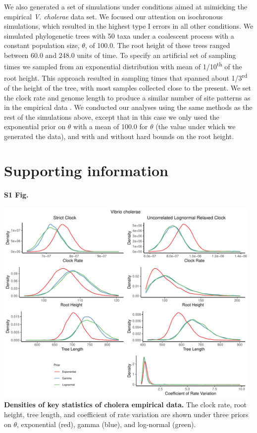 \documentclass[10pt,letterpaper]{article}
\begin{document}
{We also generated a set of simulations under conditions aimed at mimicking the empirical \textit{V. cholerae} data set. We focused our attention on isochronous simulations, which resulted in the highest type I errors in all other conditions. We simulated phylogenetic trees with 50 taxa under a coalescent process with a constant population size, $\theta$, of 100.0. The root height of these trees ranged between 60.0 and 248.0 units of time. To specify an artificial set of sampling times we sampled from an exponential distribution with mean of 1/10\textsuperscript{th} of the root height. This approach resulted in sampling times that spanned about 1/3\textsuperscript{rd} of the height of the tree, with most samples collected close to the present. We set the clock rate and genome length to produce a similar number of site patterns as in the empirical data \cite{devault2014second}. We conducted our analyses using the same methods as the rest of the simulations above, except that in this case we only used the exponential prior on $\theta$ with a mean of 100.0 for $\theta$ (the value under which we generated the data), and with and without hard bounds on the root height.}

\section*{Supporting information}

\paragraph*{S1 Fig.}
\label{S1_Fig}
	\begin{center}
		\includegraphics[width=13cm]{sandbox_figures/cholera_density_plot.pdf}\newline
		\textbf{Densities of key statistics of cholera empirical data.} The clock rate, root height, tree length, and coefficient of rate variation are shown under three priors on $\theta$, exponential (red), gamma (blue), and log-normal (green).
	\end{center}
\end{document}
